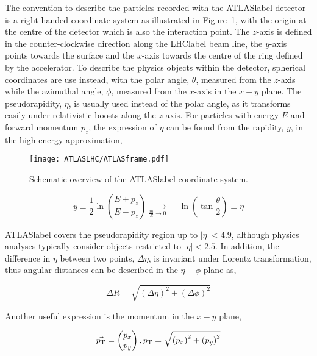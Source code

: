 The convention to describe the particles recorded with the \acrshort{ATLASlabel} detector is a right-handed coordinate system as illustrated in Figure~\ref{figLHC:ATLASframe}, with the origin at the centre of the detector which is also the interaction point. The $z$-axis is defined in the counter-clockwise direction along the \acrshort{LHClabel} beam line, the $y$-axis points towards the surface and the $x$-axis towards the centre of the ring defined by the accelerator. To describe the physics objects within the detector, spherical coordinates are use instead, with the polar angle, $\theta$, measured from the $z$-axis while the azimuthal angle, $\phi$, measured from the $x$-axis in the $x-y$ plane. The pseudorapidity, $\eta$, is usually used instead of the polar angle, as it transforms easily under relativistic boosts along the $z$-axis. For particles with energy $E$ and forward momentum $p_z$, the expression of $\eta$ can be found from the rapidity, $y$, in the high-energy approximation,

\begin{figure}[htbp]
    \RawFloats
    \begin{center}
    \texttt{[image: ATLASLHC/ATLASframe.pdf]}
    \caption{
        Schematic overview of the \acrshort{ATLASlabel} coordinate system. 
    }
    \label{figLHC:ATLASframe}
    \end{center}
\end{figure}

\begin{equation}
   y \equiv \frac{1}{2}\ln\left(\frac{E+p_z}{E-p_z}\right) \xrightarrow[ \frac{m}{E} \to 0]{} -\ln\left(\tan\frac{\theta}{2}\right)\equiv \eta
\end{equation}

\acrshort{ATLASlabel} covers the pseudorapidity region up to $|\eta|<4.9$, although physics analyses
typically consider objects restricted to $|\eta|<2.5$. In addition, the difference in $\eta$ between two points, $\Delta\eta$, is invariant under Lorentz transformation, thus angular distances can be described in the $\eta-\phi$ plane as,

\begin{equation}
    \Delta R = \sqrt{\left(\Delta\eta\right)^2+\left(\Delta\phi\right)^2}
\end{equation}

Another useful expression is the momentum in the $x-y$ plane, 

\begin{equation}
    \vec{p_{\text{T}}} = \begin{pmatrix} p_x \\ p_y \end{pmatrix}, p_{\text{T}} = \sqrt{\left(p_x\right)^2+\left(p_y\right)^2}
\end{equation}

